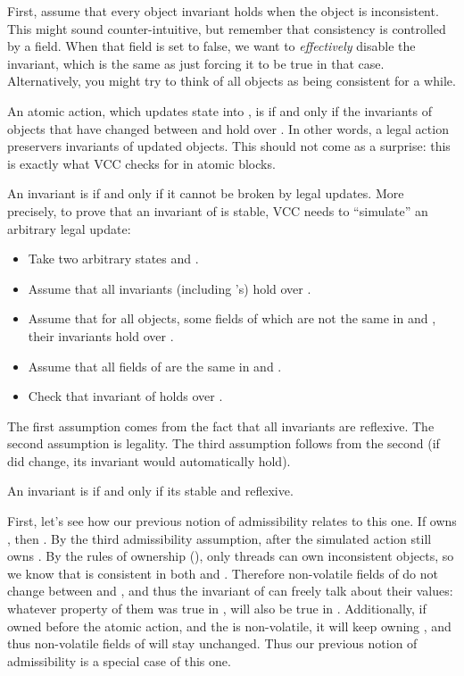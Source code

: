 First, assume that every object invariant holds when the object is inconsistent.
This might sound counter-intuitive, but remember that consistency is controlled
by a field.
When that field is set to false, we want to \emph{effectively} disable the invariant,
which is the same as just forcing it to be true in that case.
Alternatively, you might try to think of all objects as being consistent for a while.

An atomic action, which updates state  into , is  if and only if the invariants of
objects that have changed between  and  hold over .
In other words, a legal action preservers invariants of updated objects.
This should not come as a surprise: this is exactly what VCC checks
for in atomic blocks.

An invariant is  if and only if it cannot be broken by legal updates.
More precisely, to prove that an invariant of  is stable,
VCC needs to ``simulate'' an arbitrary legal update:
\begin{itemize}
\item Take two arbitrary states  and .
\item Assume that all invariants (including 's) hold over .
\item Assume that for all objects, some fields of which are not the same in  and ,
their invariants hold over .
\item Assume that all fields of  are the same in  and .
\item Check that invariant of  holds over .
\end{itemize}
The first assumption comes from the fact that all invariants are reflexive.
The second assumption is legality.
The third assumption follows from the second (if  did change, its invariant would
automatically hold).

An invariant is  if and only if its stable and reflexive.

First, let's see how our previous notion of admissibility relates to this one.
If  owns , then .
By the third admissibility assumption, after the simulated action  still owns .
By the rules of ownership (), only threads can own
inconsistent objects, so we know that  is consistent in both 
and .
Therefore non-volatile fields of  do not change between  and ,
and thus the invariant of  can freely talk about their values:
whatever property of them was true in , will also be true in .
Additionally, if  owned  before the atomic action, and the  is non-volatile,
it will keep owning , and thus non-volatile fields of 
will stay unchanged.
Thus our previous notion of admissibility is a special case of this one.

